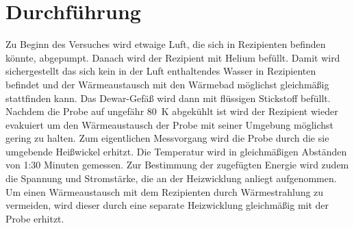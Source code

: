 \section{Durchführung}

Zu Beginn des Versuches wird etwaige Luft, die sich in Rezipienten befinden könnte, abgepumpt. Danach wird der Rezipient mit Helium befüllt. Damit wird sichergestellt das sich kein in der Luft enthaltendes Wasser in Rezipienten befindet und der Wärmeaustausch mit den Wärmebad möglichst gleichmäßig stattfinden kann. Das Dewar-Gefäß wird dann mit flüssigen Stickstoff befüllt. Nachdem die Probe auf ungefähr \SI{80}{\K} abgekühlt ist wird der Rezipient wieder evakuiert um den Wärmeaustausch der Probe mit seiner Umgebung möglichst gering zu halten.
Zum eigentlichen Messvorgang wird die Probe durch die sie umgebende Heißwickel erhitzt. Die Temperatur wird in gleichmäßigen Abständen von 1:30 Minuten gemessen. Zur Bestimmung der zugefügten Energie wird zudem die Spannung und Stromstärke, die an der Heizwicklung anliegt aufgenommen. Um einen Wärmeaustausch mit dem Rezipienten durch Wärmestrahlung zu vermeiden, wird dieser durch eine separate Heizwicklung gleichmäßig mit der Probe erhitzt. 
